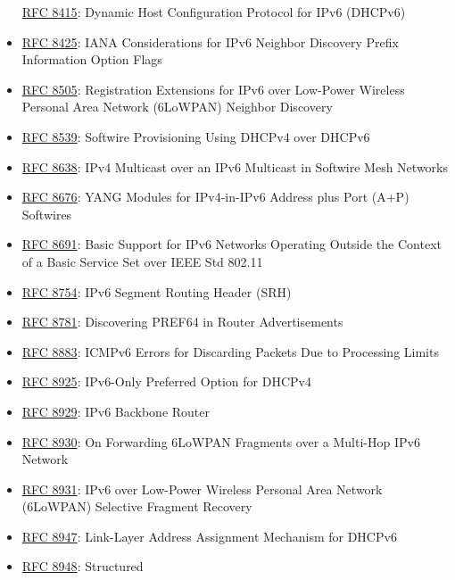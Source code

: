 \documentclass[
]{article}
\begin{document}
\begin{itemize}
  \href{https://www.rfc-editor.org/info/rfc8415}{RFC 8415}: Dynamic Host
  Configuration Protocol for IPv6 (DHCPv6)
\item
  \href{https://www.rfc-editor.org/info/rfc8425}{RFC 8425}: IANA
  Considerations for IPv6 Neighbor Discovery Prefix Information Option
  Flags
\item
  \href{https://www.rfc-editor.org/info/rfc8505}{RFC 8505}: Registration
  Extensions for IPv6 over Low-Power Wireless Personal Area Network
  (6LoWPAN) Neighbor Discovery
\item
  \href{https://www.rfc-editor.org/info/rfc8539}{RFC 8539}: Softwire
  Provisioning Using DHCPv4 over DHCPv6
\item
  \href{https://www.rfc-editor.org/info/rfc8638}{RFC 8638}: IPv4
  Multicast over an IPv6 Multicast in Softwire Mesh Networks
\item
  \href{https://www.rfc-editor.org/info/rfc8676}{RFC 8676}: YANG Modules
  for IPv4-in-IPv6 Address plus Port (A+P) Softwires
\item
  \href{https://www.rfc-editor.org/info/rfc8691}{RFC 8691}: Basic
  Support for IPv6 Networks Operating Outside the Context of a Basic
  Service Set over IEEE Std 802.11
\item
  \href{https://www.rfc-editor.org/info/rfc8754}{RFC 8754}: IPv6 Segment
  Routing Header (SRH)
\item
  \href{https://www.rfc-editor.org/info/rfc8781}{RFC 8781}: Discovering
  PREF64 in Router Advertisements
\item
  \href{https://www.rfc-editor.org/info/rfc8883}{RFC 8883}: ICMPv6
  Errors for Discarding Packets Due to Processing Limits
\item
  \href{https://www.rfc-editor.org/info/rfc8925}{RFC 8925}: IPv6-Only
  Preferred Option for DHCPv4
\item
  \href{https://www.rfc-editor.org/info/rfc8929}{RFC 8929}: IPv6
  Backbone Router
\item
  \href{https://www.rfc-editor.org/info/rfc8930}{RFC 8930}: On
  Forwarding 6LoWPAN Fragments over a Multi-Hop IPv6 Network
\item
  \href{https://www.rfc-editor.org/info/rfc8931}{RFC 8931}: IPv6 over
  Low-Power Wireless Personal Area Network (6LoWPAN) Selective Fragment
  Recovery
\item
  \href{https://www.rfc-editor.org/info/rfc8947}{RFC 8947}: Link-Layer
  Address Assignment Mechanism for DHCPv6
\item
  \href{https://www.rfc-editor.org/info/rfc8948}{RFC 8948}: Structured

\end{itemize}
\end{document}
